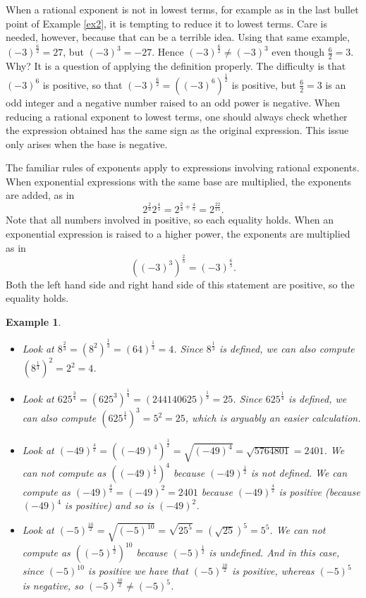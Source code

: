 \documentclass[11pt]{book}               %
\newtheorem{example}{Example}
\begin{document}
When a rational exponent is not in lowest terms, for example as in the last bullet point of Example \ref{ex2},  it is tempting to reduce it to lowest terms.
Care is needed, however, because that can be a terrible idea.
Using that same example, $\left(-3\right)^\frac{6}{2} = 27$,
but  $\left(-3\right)^3 = -27$.  Hence $\left(-3\right)^\frac{6}{2} \neq \left(-3\right)^3$ even though 
$\frac{6}{2} = 3$. Why?  It is a question of applying the definition properly. 
The difficulty is that $(-3)^6$ is positive, so that $\left(-3\right)^\frac{6}{2} = \left(\left(-3\right)^6\right)^\frac{1}{2}$  is positive, but 
$\frac{6}{2} = 3$ is an odd integer and a negative number raised to an odd power is negative.
When reducing a rational exponent to lowest terms, one should always check whether the expression obtained has the same sign as the original expression. This issue only arises when the base is negative.

The familiar rules of exponents apply to expressions involving rational exponents.  When exponential expressions with the same base are multiplied, the exponents are added, as in
$$2^\frac{2}{3} 2^\frac{4}{5} = 2^{\frac{2}{3} + \frac{4}{5}} = 2^\frac{22}{15}.$$
Note that all numbers involved in positive, so each equality holds.
When an exponential expression is raised to a higher power, the exponents are multiplied as in
$$\left((-3)^3\right)^\frac{2}{5} = (-3)^\frac{6}{5}.$$
Both the left hand side and right hand side of this statement are positive, so the equality holds.

\begin{example}
$ $
\normalfont

\begin{itemize}
\item Look at $8^\frac{2}{3} = (8^2)^\frac{1}{3}=(64)^\frac{1}{3}=4$.  
Since $8^\frac{1}{3}$ is defined, we can also compute $(8^\frac{1}{3})^2 = 2^2 = 4$.  

\item Look at $625^\frac{3}{4} = (625^3)^\frac{1}{4}=(244140625)^\frac{1}{3}=25$.
Since $625^\frac{1}{4}$ is defined, we can also compute 
$(625^\frac{1}{4})^3 = 5^2 = 25$, which is arguably an easier calculation.

\item Look at $(-49)^\frac{4}{2} = \left((-49)^4\right)^\frac{1}{2} = \sqrt{(-49)^4} = \sqrt{5764801} = 2401$.
We can not compute as  $\left((-49)^\frac{1}{2}\right)^4$ because  $(-49)^\frac{1}{2}$ is not defined.
We can compute as $(-49)^\frac{4}{2} = (-49)^2 = 2401$ because $(-49)^\frac{4}{2}$ is positive (because $(-49)^4$ is positive) and so is $(-49)^2$.

\item Look at $(-5)^\frac{10}{2} = \sqrt{(-5)^{10}} = \sqrt{25^5} = \left(\sqrt{25}\right)^5 = 5^5$.
We can not compute as $\left((-5)^\frac{1}{2}\right)^{10}$ because $(-5)^\frac{1}{2}$ is undefined.
And in this case, since $(-5)^{10}$ is positive we have that $(-5)^\frac{10}{2}$ is positive, whereas 
$(-5)^5$ is negative, so $(-5)^\frac{10}{2} \neq (-5)^5$.
\end{itemize}
\end{example}
\end{document}

